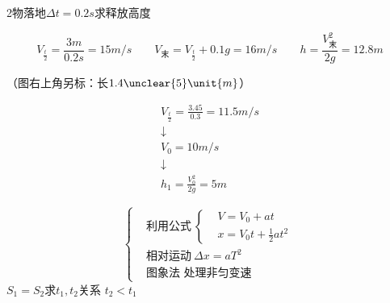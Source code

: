 \begin{problem}[①]
2物落地\quad $\Delta t=0.2\unit{s}$\quad 求释放高度
\begin{solution}
\[
V_{\frac t2}=\frac{3\unit{m}}{0.2\unit{s}}=15\unit{m/s}\qquad
V_{\text{末}}=V_{\frac t2}+0.1g=16\unit{m/s}\qquad %
h=\frac{V_{\text{末}}^{2}}{2g}=12.8\unit{m}
\]
\end{solution}
\end{problem}
\begin{problem}[②]
（图右上角另标：长$1.4\unclear{5}\unit{m}$） %
\begin{solution}
\begin{gather*}
V_{\frac t2}=\frac{3.45}{0.3}=11.5\unit{m/s}\\
\downarrow\\
V_0=10\unit{m/s}\\
\downarrow\\
h_1=\frac{V_0^{2}}{2g}=5\unit{m}
\end{gather*}
\end{solution}
\end{problem}
\[
\left\{\begin{aligned}
&\text{利用公式}\ \left\{\begin{aligned}&V=V_0+at\\&x=V_0t+\tfrac12at^2\end{aligned}\right.\\[6pt]
&\text{相对运动}\ \Delta x=aT^2\\[6pt]
&\text{图象法\ \ 处理非匀变速}
\end{aligned}\right.
\]
$S_1=S_2$\quad 求$t_1,t_2$关系
$t_2<t_1$

